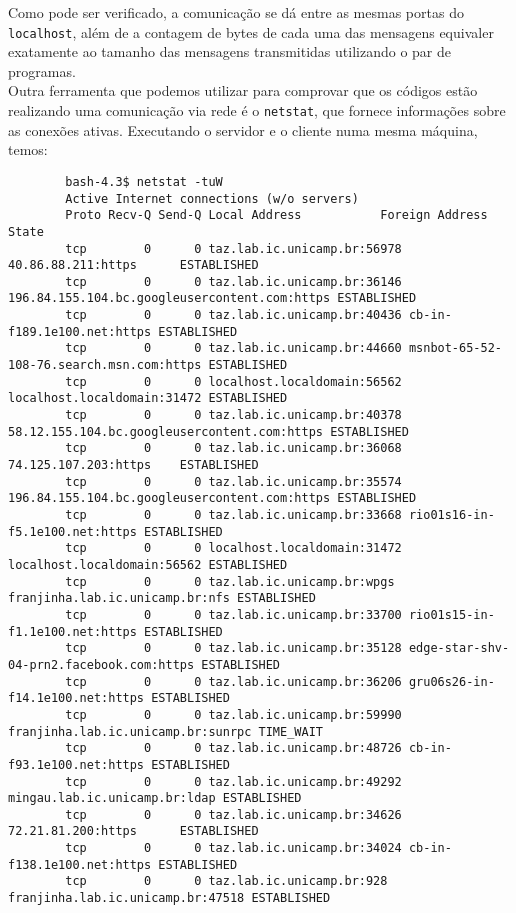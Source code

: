 \documentclass[a4paper,10pt]{article}
\begin{document}
    Como pode ser verificado, a comunicação se dá entre as mesmas portas do {\tt localhost}, além de a contagem de bytes de cada uma das mensagens equivaler exatamente ao tamanho das mensagens transmitidas utilizando o par de programas.\\
    
    Outra ferramenta que podemos utilizar para comprovar que os códigos estão realizando uma comunicação via rede é o {\tt netstat}, que fornece informações sobre as conexões ativas. Executando o servidor e o cliente numa mesma máquina, temos:
    
    \begin{lstlisting}
        bash-4.3$ netstat -tuW
        Active Internet connections (w/o servers)
        Proto Recv-Q Send-Q Local Address           Foreign Address         State      
        tcp        0      0 taz.lab.ic.unicamp.br:56978 40.86.88.211:https      ESTABLISHED
        tcp        0      0 taz.lab.ic.unicamp.br:36146 196.84.155.104.bc.googleusercontent.com:https ESTABLISHED
        tcp        0      0 taz.lab.ic.unicamp.br:40436 cb-in-f189.1e100.net:https ESTABLISHED
        tcp        0      0 taz.lab.ic.unicamp.br:44660 msnbot-65-52-108-76.search.msn.com:https ESTABLISHED
        tcp        0      0 localhost.localdomain:56562 localhost.localdomain:31472 ESTABLISHED
        tcp        0      0 taz.lab.ic.unicamp.br:40378 58.12.155.104.bc.googleusercontent.com:https ESTABLISHED
        tcp        0      0 taz.lab.ic.unicamp.br:36068 74.125.107.203:https    ESTABLISHED
        tcp        0      0 taz.lab.ic.unicamp.br:35574 196.84.155.104.bc.googleusercontent.com:https ESTABLISHED
        tcp        0      0 taz.lab.ic.unicamp.br:33668 rio01s16-in-f5.1e100.net:https ESTABLISHED
        tcp        0      0 localhost.localdomain:31472 localhost.localdomain:56562 ESTABLISHED
        tcp        0      0 taz.lab.ic.unicamp.br:wpgs franjinha.lab.ic.unicamp.br:nfs ESTABLISHED
        tcp        0      0 taz.lab.ic.unicamp.br:33700 rio01s15-in-f1.1e100.net:https ESTABLISHED
        tcp        0      0 taz.lab.ic.unicamp.br:35128 edge-star-shv-04-prn2.facebook.com:https ESTABLISHED
        tcp        0      0 taz.lab.ic.unicamp.br:36206 gru06s26-in-f14.1e100.net:https ESTABLISHED
        tcp        0      0 taz.lab.ic.unicamp.br:59990 franjinha.lab.ic.unicamp.br:sunrpc TIME_WAIT  
        tcp        0      0 taz.lab.ic.unicamp.br:48726 cb-in-f93.1e100.net:https ESTABLISHED
        tcp        0      0 taz.lab.ic.unicamp.br:49292 mingau.lab.ic.unicamp.br:ldap ESTABLISHED
        tcp        0      0 taz.lab.ic.unicamp.br:34626 72.21.81.200:https      ESTABLISHED
        tcp        0      0 taz.lab.ic.unicamp.br:34024 cb-in-f138.1e100.net:https ESTABLISHED
        tcp        0      0 taz.lab.ic.unicamp.br:928 franjinha.lab.ic.unicamp.br:47518 ESTABLISHED

    \end{lstlisting}
    
\end{document}
